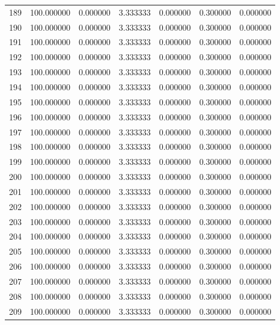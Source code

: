 \begin{tabular}{rrrrrrr}
189 & 100.000000 &    0.000000 &  3.333333 &    0.000000 &    0.300000 &  0.000000 \\
190 & 100.000000 &    0.000000 &  3.333333 &    0.000000 &    0.300000 &  0.000000 \\
191 & 100.000000 &    0.000000 &  3.333333 &    0.000000 &    0.300000 &  0.000000 \\
192 & 100.000000 &    0.000000 &  3.333333 &    0.000000 &    0.300000 &  0.000000 \\
193 & 100.000000 &    0.000000 &  3.333333 &    0.000000 &    0.300000 &  0.000000 \\
194 & 100.000000 &    0.000000 &  3.333333 &    0.000000 &    0.300000 &  0.000000 \\
195 & 100.000000 &    0.000000 &  3.333333 &    0.000000 &    0.300000 &  0.000000 \\
196 & 100.000000 &    0.000000 &  3.333333 &    0.000000 &    0.300000 &  0.000000 \\
197 & 100.000000 &    0.000000 &  3.333333 &    0.000000 &    0.300000 &  0.000000 \\
198 & 100.000000 &    0.000000 &  3.333333 &    0.000000 &    0.300000 &  0.000000 \\
199 & 100.000000 &    0.000000 &  3.333333 &    0.000000 &    0.300000 &  0.000000 \\
200 & 100.000000 &    0.000000 &  3.333333 &    0.000000 &    0.300000 &  0.000000 \\
201 & 100.000000 &    0.000000 &  3.333333 &    0.000000 &    0.300000 &  0.000000 \\
202 & 100.000000 &    0.000000 &  3.333333 &    0.000000 &    0.300000 &  0.000000 \\
203 & 100.000000 &    0.000000 &  3.333333 &    0.000000 &    0.300000 &  0.000000 \\
204 & 100.000000 &    0.000000 &  3.333333 &    0.000000 &    0.300000 &  0.000000 \\
205 & 100.000000 &    0.000000 &  3.333333 &    0.000000 &    0.300000 &  0.000000 \\
206 & 100.000000 &    0.000000 &  3.333333 &    0.000000 &    0.300000 &  0.000000 \\
207 & 100.000000 &    0.000000 &  3.333333 &    0.000000 &    0.300000 &  0.000000 \\
208 & 100.000000 &    0.000000 &  3.333333 &    0.000000 &    0.300000 &  0.000000 \\
209 & 100.000000 &    0.000000 &  3.333333 &    0.000000 &    0.300000 &  0.000000 \\

\end{tabular}
